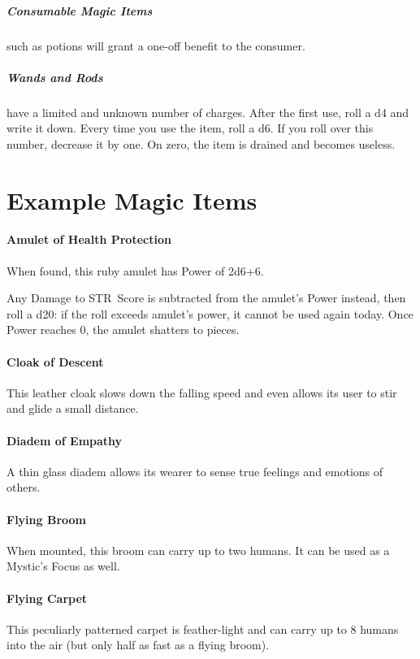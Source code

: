 \documentclass[itdr]{subfiles}
\begin{document}
\subparagraph{Consumable Magic Items} such as potions will grant a one-off benefit to the consumer.

\subparagraph{Wands and Rods} have a limited and unknown number of charges. After the first use, roll a d4 and write it down. Every time you use the item, roll a d6. If you roll over this number, decrease it by one. On zero, the item is drained and becomes useless.



\vfill
\break


\section{Example Magic Items}

\paragraph{Amulet of Health Protection}
When found, this ruby amulet has Power of 2d6+6.

Any Damage to STR~Score is subtracted from the amulet's Power instead, then roll a d20: if the roll exceeds amulet's power, it cannot be used again today. Once Power reaches 0, the amulet shatters to pieces.

\paragraph{Cloak of Descent}
This leather cloak slows down the falling speed and even allows its user to stir and glide a small distance.

\paragraph{Diadem of Empathy}
A thin glass diadem allows its wearer to sense true feelings and emotions of others.

\paragraph{Flying Broom}
When mounted, this broom can carry up to two \mbox{humans}. It can be used as a Mystic's Focus as well.

\paragraph{Flying Carpet}
This peculiarly patterned carpet is feather-light and can carry up to 8 humans into the air (but only half as fast as a flying broom).
\end{document}

